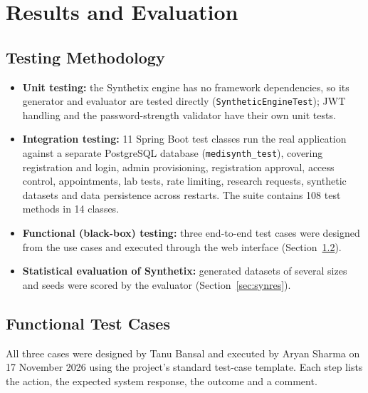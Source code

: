 \documentclass{tietreport}
\begin{document}
\chapter{Results and Evaluation}
\label{ch:results}

\section{Testing Methodology}

\begin{itemize}
  \item \textbf{Unit testing:} the Synthetix engine has no framework
    dependencies, so its generator and evaluator are tested directly
    (\texttt{SyntheticEngineTest}); JWT handling and the password-strength
    validator have their own unit tests.
  \item \textbf{Integration testing:} 11 Spring Boot test classes run the real
    application against a separate PostgreSQL database
    (\texttt{medisynth\_test}), covering registration and login, admin
    provisioning, registration approval, access control, appointments, lab
    tests, rate limiting, research requests, synthetic datasets and data
    persistence across restarts. The suite contains 108 test methods in 14
    classes.
  \item \textbf{Functional (black-box) testing:} three end-to-end test cases
    were designed from the use cases and executed through the web interface
    (Section~\ref{sec:tc}).
  \item \textbf{Statistical evaluation of Synthetix:} generated datasets of
    several sizes and seeds were scored by the evaluator
    (Section~\ref{sec:synres}).
\end{itemize}

\section{Functional Test Cases}
\label{sec:tc}

All three cases were designed by Tanu Bansal and executed by Aryan Sharma on
17 November 2026 using the project's standard test-case template. Each step
lists the action, the expected system response, the outcome and a comment.
\end{document}
